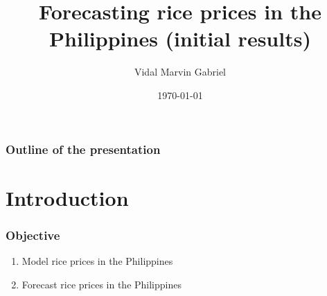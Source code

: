 \documentclass{beamer}
\title[Time series forecasting]{Forecasting rice prices in the Philippines (initial results)} %
\author{Vidal Marvin Gabriel} %
\institute[EFFG] %
{
Data Analytics Specialist \\
\medskip
}
\date{\today} %
\begin{document}
\begin{frame}
\titlepage %
\end{frame}

\begin{frame}
\frametitle{Outline of the presentation} %
\tableofcontents %
\end{frame}


\section{Introduction} %



\begin{frame}
\frametitle{Objective}
\begin{enumerate}
	\item Model rice prices in the Philippines
	\item Forecast rice prices in the Philippines
\end{enumerate}
\end{frame}
\end{document}
